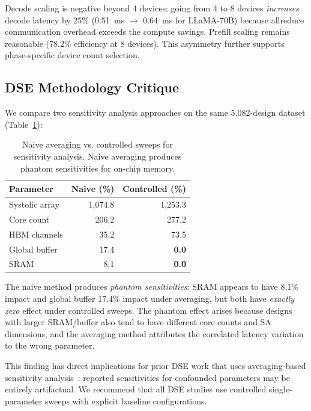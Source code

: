 \documentclass[sigconf,10pt]{acmart}
\begin{document}
Decode scaling is negative beyond 4 devices: going from 4 to 8 devices
\emph{increases} decode latency by 25\% (0.51~ms $\to$ 0.64~ms for
LLaMA-70B) because allreduce communication overhead exceeds the compute
savings. Prefill scaling remains reasonable (78.2\% efficiency at 8
devices). This asymmetry further supports phase-specific device count
selection.

\subsection{DSE Methodology Critique}
\label{sec:methodology_critique}

We compare two sensitivity analysis approaches on the same 5,082-design
dataset (Table~\ref{tab:method_compare}):

\begin{table}[t]
\centering
\caption{Naive averaging vs. controlled sweeps for sensitivity analysis.
Naive averaging produces phantom sensitivities for on-chip memory.}
\label{tab:method_compare}
\begin{tabular}{lrr}
\toprule
\textbf{Parameter} & \textbf{Naive (\%)} & \textbf{Controlled (\%)} \\
\midrule
Systolic array & 1,074.8 & 1,253.3 \\
Core count     & 206.2   & 277.2 \\
HBM channels   & 35.2    & 73.5 \\
Global buffer  & 17.4    & \textbf{0.0} \\
SRAM           & 8.1     & \textbf{0.0} \\
\bottomrule
\end{tabular}
\end{table}

The naive method produces \emph{phantom sensitivities}: SRAM appears to
have 8.1\% impact and global buffer 17.4\% impact under averaging, but
both have \emph{exactly zero} effect under controlled sweeps. The phantom
effect arises because designs with larger SRAM/buffer also tend to have
different core counts and SA dimensions, and the averaging method
attributes the correlated latency variation to the wrong parameter.

This finding has direct implications for prior DSE work that uses
averaging-based sensitivity analysis~\cite{llmcompass}: reported
sensitivities for confounded parameters may be entirely artifactual.
We recommend that all DSE studies use controlled single-parameter sweeps
with explicit baseline configurations.
\end{document}
